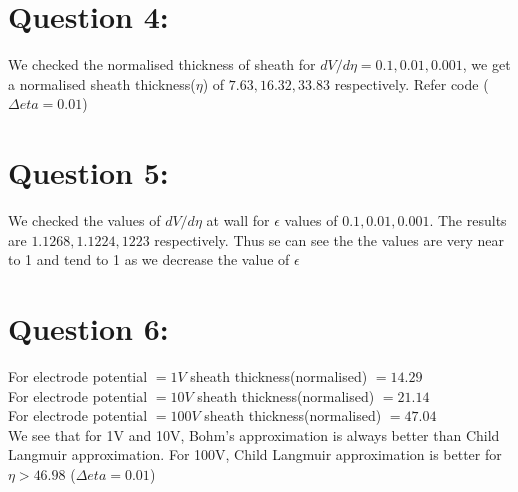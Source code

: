 \documentclass[11pt, a4paper]{article}
\begin{document}
\section{Question 4:}
We checked the normalised thickness of sheath for $dV/d\eta = 0.1, 0.01, 0.001$, we get a normalised sheath thickness($\eta$)
of $7.63, 16.32, 33.83$ respectively. Refer code ($\Delta eta = 0.01$)

\section{Question 5:}
We checked the values of $dV/d\eta$ at wall for $\epsilon$ values of $0.1, 0.01, 0.001$. The results are $1.1268, 1.1224, 1223$
respectively. Thus se can see the the values are very near to 1 and tend to 1 as we decrease the value of $\epsilon$

\section{Question 6:}
For electrode potential $= 1V$ sheath thickness(normalised) $= 14.29$\\
For electrode potential $= 10V$ sheath thickness(normalised) $= 21.14$\\
For electrode potential $= 100V$ sheath thickness(normalised) $= 47.04$\\
We see that for 1V and 10V, Bohm's approximation is always better than Child Langmuir approximation. For 100V, Child Langmuir
approximation is better for $\eta > 46.98$ ($\Delta eta = 0.01$)
\end{document}
